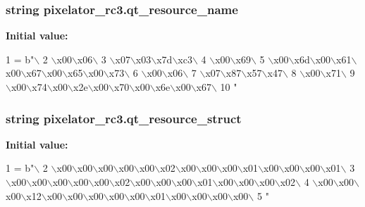 \subsubsection[{qt\+\_\+resource\+\_\+name}]{\setlength{\rightskip}{0pt plus 5cm}string pixelator\+\_\+rc3.\+qt\+\_\+resource\+\_\+name}\label{namespacepixelator__rc3_ad057b9cf440f9e23e140f156223870b5}
{\bfseries Initial value\+:}
\begin{DoxyCode}
1 = b\textcolor{stringliteral}{"\(\backslash\)}
2 \textcolor{stringliteral}{\(\backslash\)x00\(\backslash\)x06\(\backslash\)}
3 \textcolor{stringliteral}{\(\backslash\)x07\(\backslash\)x03\(\backslash\)x7d\(\backslash\)xc3\(\backslash\)}
4 \textcolor{stringliteral}{\(\backslash\)x00\(\backslash\)x69\(\backslash\)}
5 \textcolor{stringliteral}{\(\backslash\)x00\(\backslash\)x6d\(\backslash\)x00\(\backslash\)x61\(\backslash\)x00\(\backslash\)x67\(\backslash\)x00\(\backslash\)x65\(\backslash\)x00\(\backslash\)x73\(\backslash\)}
6 \textcolor{stringliteral}{\(\backslash\)x00\(\backslash\)x06\(\backslash\)}
7 \textcolor{stringliteral}{\(\backslash\)x07\(\backslash\)x87\(\backslash\)x57\(\backslash\)x47\(\backslash\)}
8 \textcolor{stringliteral}{\(\backslash\)x00\(\backslash\)x71\(\backslash\)}
9 \textcolor{stringliteral}{\(\backslash\)x00\(\backslash\)x74\(\backslash\)x00\(\backslash\)x2e\(\backslash\)x00\(\backslash\)x70\(\backslash\)x00\(\backslash\)x6e\(\backslash\)x00\(\backslash\)x67\(\backslash\)}
10 \textcolor{stringliteral}{"}
\end{DoxyCode}
\hypertarget{namespacepixelator__rc3_a39b2c56e2fdf8080fbc211741fb2e103}{}
\subsubsection[{qt\+\_\+resource\+\_\+struct}]{\setlength{\rightskip}{0pt plus 5cm}string pixelator\+\_\+rc3.\+qt\+\_\+resource\+\_\+struct}\label{namespacepixelator__rc3_a39b2c56e2fdf8080fbc211741fb2e103}
{\bfseries Initial value\+:}
\begin{DoxyCode}
1 = b\textcolor{stringliteral}{"\(\backslash\)}
2 \textcolor{stringliteral}{\(\backslash\)x00\(\backslash\)x00\(\backslash\)x00\(\backslash\)x00\(\backslash\)x00\(\backslash\)x02\(\backslash\)x00\(\backslash\)x00\(\backslash\)x00\(\backslash\)x01\(\backslash\)x00\(\backslash\)x00\(\backslash\)x00\(\backslash\)x01\(\backslash\)}
3 \textcolor{stringliteral}{\(\backslash\)x00\(\backslash\)x00\(\backslash\)x00\(\backslash\)x00\(\backslash\)x00\(\backslash\)x02\(\backslash\)x00\(\backslash\)x00\(\backslash\)x00\(\backslash\)x01\(\backslash\)x00\(\backslash\)x00\(\backslash\)x00\(\backslash\)x02\(\backslash\)}
4 \textcolor{stringliteral}{\(\backslash\)x00\(\backslash\)x00\(\backslash\)x00\(\backslash\)x12\(\backslash\)x00\(\backslash\)x00\(\backslash\)x00\(\backslash\)x00\(\backslash\)x00\(\backslash\)x01\(\backslash\)x00\(\backslash\)x00\(\backslash\)x00\(\backslash\)x00\(\backslash\)}
5 \textcolor{stringliteral}{"}
\end{DoxyCode}
